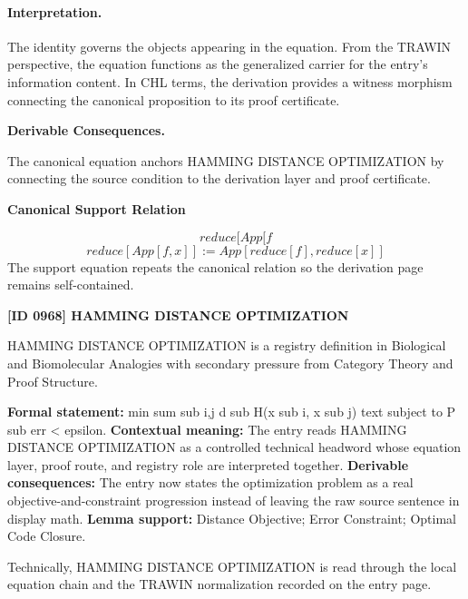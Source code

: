 \paragraph{Interpretation.}
The identity governs the objects appearing in the equation. From the TRAWIN perspective, the equation functions as the generalized carrier for the entry’s information content. In CHL terms, the derivation provides a witness morphism connecting the canonical proposition to its proof certificate.

\par\vspace{0.35em}
\noindent\textbf{Derivable Consequences.}\quad
\begingroup
\footnotesize
\raggedright
The canonical equation anchors HAMMING DISTANCE OPTIMIZATION by connecting the source condition to the derivation layer and proof certificate.
\par\endgroup

\noindent\textbf{Canonical Support Relation}\par
\[
reduce[App[f
\]
\[
reduce[App[f, x]] := App[reduce[f], reduce[x]]
\]
\noindent The support equation repeats the canonical relation so the derivation page remains self-contained.\par

\clearpage
\noindent\textbf{[ID 0968] HAMMING DISTANCE OPTIMIZATION}\par
\vspace{0.35em}
\begingroup\small
{}
HAMMING DISTANCE OPTIMIZATION is a registry definition in Biological and Biomolecular Analogies with secondary pressure from Category Theory and Proof Structure.

\begingroup\footnotesize\setlength{\emergencystretch}{3em}\sloppy
\textbf{Formal statement:} min sum sub i,j d sub H(x sub i, x sub j) text subject to P sub err < epsilon. \textbf{Contextual meaning:} The entry reads HAMMING DISTANCE OPTIMIZATION as a controlled technical headword whose equation layer, proof route, and registry role are interpreted together. \textbf{Derivable consequences:} The entry now states the optimization problem as a real objective-and-constraint progression instead of leaving the raw source sentence in display math. \textbf{Lemma support:} Distance Objective; Error Constraint; Optimal Code Closure.\par
\endgroup

Technically, HAMMING DISTANCE OPTIMIZATION is read through the local equation chain and the TRAWIN normalization recorded on the entry page.


